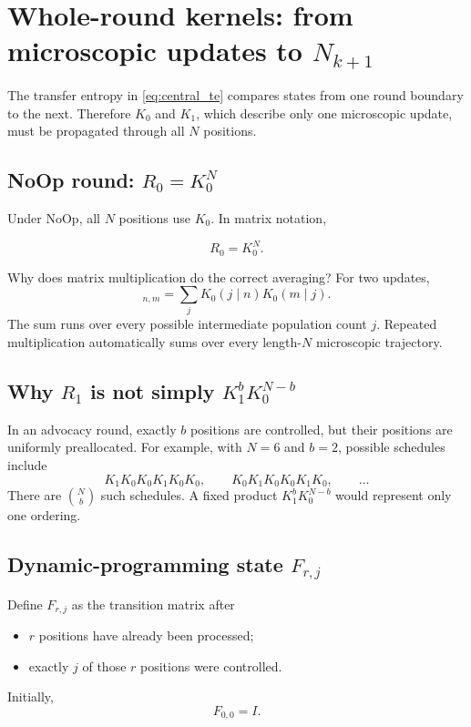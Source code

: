 \documentclass[11pt,a4paper]{article}
\newcommand{\NoOp}{\ensuremath{\mathrm{NoOp}}}
\newcommand{\1}{\mathbbm{1}}
\begin{document}
\section{Whole-round kernels: from microscopic updates to $N_{k+1}$}

The transfer entropy in \cref{eq:central_te} compares states from one round boundary to the next. Therefore $K_0$ and $K_1$, which describe only one microscopic update, must be propagated through all $N$ positions.

\subsection{NoOp round: $R_0=K_0^N$}

Under $\NoOp$, all $N$ positions use $K_0$. In matrix notation,
\begin{resultbox}
\begin{equation}
\boxed{R_0=K_0^N.}
\label{eq:R0}
\end{equation}
\end{resultbox}

Why does matrix multiplication do the correct averaging? For two updates,
\begin{equation}
[K_0^2]_{n,m}
=
\sum_j K_0(j\mid n)K_0(m\mid j).
\end{equation}
The sum runs over every possible intermediate population count $j$. Repeated multiplication automatically sums over every length-$N$ microscopic trajectory.

\subsection{Why $R_1$ is not simply $K_1^bK_0^{N-b}$}

In an advocacy round, exactly $b$ positions are controlled, but their positions are uniformly preallocated. For example, with $N=6$ and $b=2$, possible schedules include
\[
K_1K_0K_0K_1K_0K_0,
\qquad
K_0K_1K_0K_0K_1K_0,
\qquad\ldots
\]
There are $\binom{N}{b}$ such schedules. A fixed product $K_1^bK_0^{N-b}$ would represent only one ordering.

\subsection{Dynamic-programming state $F_{r,j}$}

Define $F_{r,j}$ as the transition matrix after
\begin{itemize}[leftmargin=1.5em]
\item $r$ positions have already been processed;
\item exactly $j$ of those $r$ positions were controlled.
\end{itemize}
Initially,
\begin{equation}
F_{0,0}=I.
\end{equation}
\end{document}

